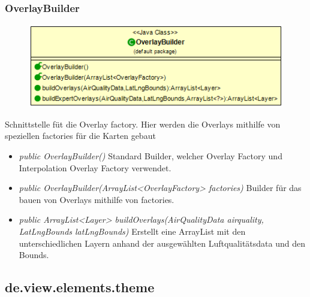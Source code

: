 \begin{itemize} [noitemsep]
\subsubsection{OverlayBuilder}
\begin{minipage}{0.3\textwidth}
    \begin{figure}[H]
        \includegraphics[scale = 0.5
        ]{media/view/factory/OverlayBuilder_Class.png}
    \end{figure}
    \end{minipage} \hfill
    \begin{minipage}{0.6\textwidth}
Schnittstelle füt die Overlay factory. Hier werden die Overlays mithilfe von speziellen factories für die Karten gebaut
\end{minipage}
\begin{itemize} [noitemsep]
    \item \emph{public OverlayBuilder()} Standard Builder, welcher Overlay Factory und Interpolation Overlay Factory verwendet.
    \item \emph{public OverlayBuilder(ArrayList<OverlayFactory> factories)} Builder für das bauen von Overlays mithilfe von factories.
    \item \emph{public ArrayList<Layer> buildOverlays(AirQualityData airquality, LatLngBounds latLngBounds)} Erstellt eine ArrayList mit den unterschiedlichen Layern anhand der ausgewählten Luftqualitätsdata und den Bounds.
\end{itemize}


\subsection{de.view.elements.theme}


\end{itemize}
